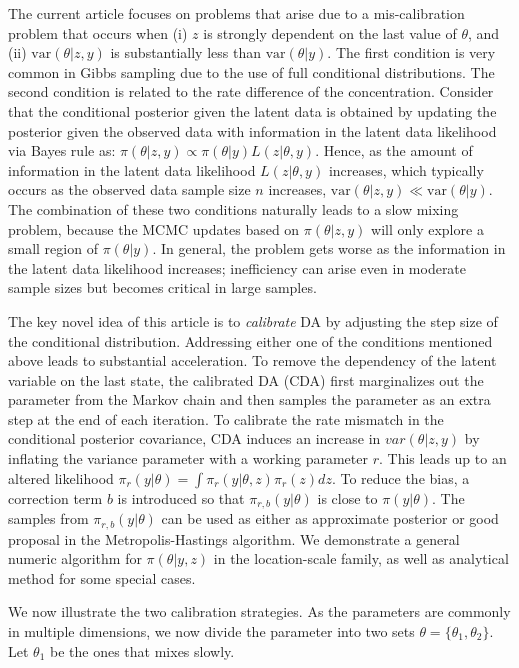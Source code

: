 \documentclass[10pt]{article}
\begin{document}
The current article focuses on problems that arise due to a mis-calibration problem that occurs when {(i) \color{red} $z$ is strongly dependent on the last value of $\theta$, and (ii) $\mbox{var}(\theta | z,y)$ is substantially less than $\mbox{var}( \theta | y)$.  The first condition is very common in Gibbs sampling due to the use of full conditional distributions.} The second condition is related to the rate difference of the concentration.  Consider that the conditional posterior given the latent data is obtained by updating the posterior given the observed data with information in the latent data likelihood via Bayes rule as: $\pi( \theta | z, y) \propto \pi( \theta | y) L( z | \theta, y)$.  Hence, as the amount of information in the latent data likelihood $L(z | \theta, y)$ increases, which typically occurs as the observed data sample size $n$ increases, $\mbox{var}(\theta | z,y) \ll \mbox{var}( \theta | y)$.  The combination of these two conditions naturally leads to a slow mixing problem, because the MCMC updates based on $\pi(\theta | z,y)$ will only explore a small region of $\pi( \theta | y)$.  In general, the problem gets worse as the information in the latent data likelihood increases; inefficiency can arise even in moderate sample sizes but becomes critical in large samples.

The key novel idea of this article is to {\em calibrate} DA by adjusting the step size of the conditional distribution. Addressing either one of the conditions mentioned above leads to substantial acceleration. To remove the dependency of the latent variable on the last state,  the calibrated DA (CDA) first marginalizes out the parameter from the Markov chain and then samples the parameter as an extra step at the end of each iteration. To calibrate the rate mismatch in the conditional posterior covariance, CDA induces an increase in $var( \theta | z,y)$ by  inflating the variance parameter with a working parameter $r$. This leads up to an altered likelihood $\pi_r(y|\theta)= \int \pi_r(y|\theta,z)\pi_r(z)dz$. To reduce the bias, a correction term $b$ is introduced so that $\pi_{r,b}(y|\theta)$ is close to $\pi(y|\theta)$. The samples from $\pi_{r,b}(y|\theta)$ can be used as either as approximate posterior or good proposal in the Metropolis-Hastings algorithm. We demonstrate a general numeric algorithm for $\pi(\theta | y,z)$ in the location-scale family, as well as analytical method for some special cases.

We now illustrate the two calibration strategies. As the parameters are commonly in multiple dimensions, we now divide the parameter into two sets $\theta=\{\theta_1,\theta_2 \}$. Let $\theta_1$ be the ones that mixes slowly.
\end{document}
